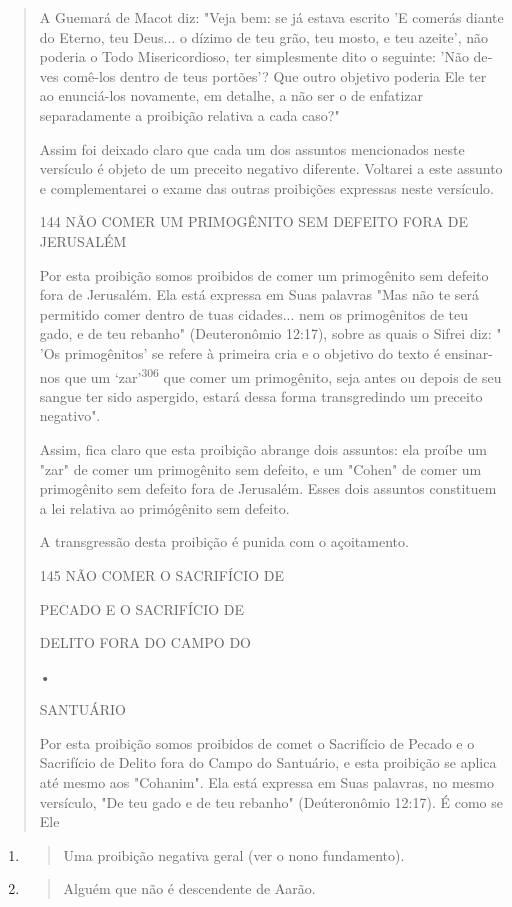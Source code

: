 \begin{quote}
A Guemará de Macot diz: "Veja bem: se já estava escrito 'E comerás
diante do Eterno, teu Deus... o dízimo de teu grão, teu mosto, e teu
azeite', não poderia o Todo Misericordioso, ter simplesmente dito o
seguinte: 'Não de­ves comê-los dentro de teus portões'? Que outro
objetivo poderia Ele ter ao enunciá-los novamente, em detalhe, a não ser
o de enfatizar separadamente a proibição relativa a cada caso?"

Assim foi deixado claro que cada um dos assuntos mencionados neste
versículo é objeto de um preceito negativo diferente. Voltarei a este
assunto e complementarei o exame das outras proibições expressas neste
versículo.

144 NÃO COMER UM PRIMOGÊNITO SEM DEFEITO FORA DE JERUSALÉM

Por esta proibição somos proibidos de comer um primogênito sem defeito
fora de Jerusalém. Ela está expressa em Suas palavras "Mas não te será
permitido comer dentro de tuas cidades... nem os primogênitos de teu
gado, e de teu rebanho" (Deuteronômio 12:17), sobre as quais o Sifrei
diz: " 'Os pri­mogênitos' se refere à primeira cria e o objetivo do
texto é ensinar-nos que um `zar'\textsuperscript{306} que comer um
primogênito, seja antes ou depois de seu sangue ter sido aspergido,
estará dessa forma transgredindo um preceito negativo".

Assim, fica claro que esta proibição abrange dois assuntos: ela proí­be
um "zar" de comer um primogênito sem defeito, e um "Cohen" de comer um
primogênito sem defeito fora de Jerusalém. Esses dois assuntos
constituem a lei relativa ao primógênito sem defeito.

A transgressão desta proibição é punida com o açoitamento.

145 NÃO COMER O SACRIFÍCIO DE

PECADO E O SACRIFÍCIO DE

DELITO FORA DO CAMPO DO

•

SANTUÁRIO

Por esta proibição somos proibidos de comet o Sacrifício de Pecado e o
Sacrifício de Delito fora do Campo do Santuário, e esta proibição se
aplica até mesmo aos "Cohanim". Ela está expressa em Suas palavras, no
mesmo ver­sículo, "De teu gado e de teu rebanho" (Deúteronômio 12:17). É
como se Ele
\end{quote}

\begin{enumerate}
\def\labelenumi{\arabic{enumi}.}
\setcounter{enumi}{304}
\item
  \begin{quote}
  Uma proibição negativa geral (ver o nono fundamento).
  \end{quote}
\item
  \begin{quote}
  Alguém que não é descendente de Aarão.
  \end{quote}
\end{enumerate}

